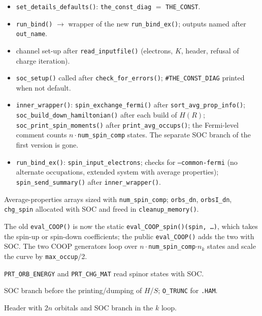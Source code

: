 \documentclass[11pt,a4paper]{article}
\newcommand{\file}[1]{\texttt{#1}}
\newcommand{\fn}[1]{\texttt{#1()}}
\newcommand{\var}[1]{\texttt{#1}}
\newcommand{\opt}[1]{\texttt{#1}}
\begin{document}
\begin{description}[style=nextline,leftmargin=1.2em]
\item[\file{tightbind/driver.c}]
  \begin{itemize}[nosep]
  \item \fn{set\_details\_defaults}: \var{the\_const\_diag} $=$ \var{THE\_CONST}.
  \item \fn{run\_bind} $\to$ wrapper of the new \fn{run\_bind\_ex}; outputs named after
    \var{out\_name}.
  \item channel set-up after \fn{read\_inputfile} (electrons, $K$, header, refusal of
    charge iteration).
  \item \fn{soc\_setup} called after \fn{check\_for\_errors}; \texttt{\#THE\_CONST\_DIAG}
    printed when not default.
  \item \fn{inner\_wrapper}: \fn{spin\_exchange\_fermi} after \fn{sort\_avg\_prop\_info};
    \fn{soc\_build\_down\_hamiltonian} after each build of $H(R)$;
    \fn{soc\_print\_spin\_moments} after \fn{print\_avg\_occups}; the Fermi-level comment
    counts $n\cdot$\var{num\_spin\_comp} states. The separate SOC branch of the first
    version is gone.
  \item \fn{run\_bind\_ex}: \var{spin\_input\_electrons}; checks for
    \opt{--common-fermi} (no alternate occupations, extended system with average
    properties); \fn{spin\_send\_summary} after \fn{inner\_wrapper}.
  \end{itemize}

\item[\file{tightbind/memory.c}] Average-properties arrays sized with
  \var{num\_spin\_comp}; \var{orbs\_dn}, \var{orbsI\_dn}, \var{chg\_spin} allocated with
  SOC and freed in \fn{cleanup\_memory}.

\item[\file{tightbind/COOP\_stuff.c}] The old \fn{eval\_COOP} is now the static
  \fn{eval\_COOP\_spin}\texttt{(spin, \ldots)}, which takes the spin-up or spin-down
  coefficients; the public \fn{eval\_COOP} adds the two with SOC. The two COOP generators
  loop over $n\cdot$\var{num\_spin\_comp}$\cdot n_k$ states and scale the curve by
  \var{max\_occup}/2.

\item[\file{tightbind/walsh.c}] \texttt{PRT\_ORB\_ENERGY} and \texttt{PRT\_CHG\_MAT} read
  spinor states with SOC.

\item[\file{tightbind/kpoints.c}] SOC branch before the printing/dumping of $H$/$S$;
  \texttt{O\_TRUNC} for \texttt{.HAM}.

\item[\file{tightbind/bands.c}] Header with $2n$ orbitals and SOC branch in the $k$ loop.


\end{description}
\end{document}
